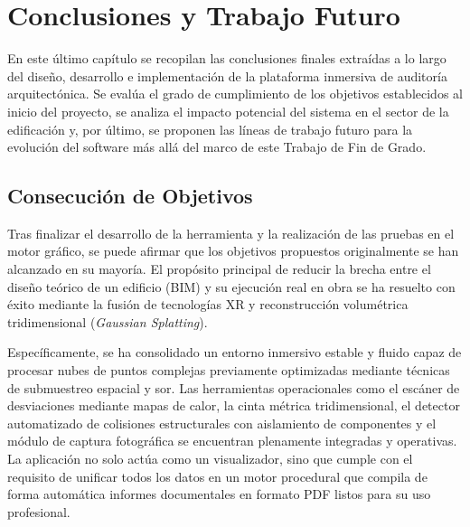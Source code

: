\chapter{Conclusiones y Trabajo Futuro\label{conclusiones}}

En este último capítulo se recopilan las conclusiones finales extraídas a lo largo del diseño, desarrollo e implementación de la plataforma inmersiva de auditoría arquitectónica. Se evalúa el grado de cumplimiento de los objetivos establecidos al inicio del proyecto, se analiza el impacto potencial del sistema en el sector de la edificación y, por último, se proponen las líneas de trabajo futuro para la evolución del software más allá del marco de este Trabajo de Fin de Grado.

\section{Consecución de Objetivos}
Tras finalizar el desarrollo de la herramienta y la realización de las pruebas en el motor gráfico, se puede afirmar que los objetivos propuestos originalmente se han alcanzado en su mayoría. El propósito principal de reducir la brecha entre el diseño teórico de un edificio (BIM) y su ejecución real en obra se ha resuelto con éxito mediante la fusión de tecnologías XR y reconstrucción volumétrica tridimensional (\textit{Gaussian Splatting}).

Específicamente, se ha consolidado un entorno inmersivo estable y fluido capaz de procesar nubes de puntos complejas previamente optimizadas mediante técnicas de submuestreo espacial y \gls{sor}. Las herramientas operacionales como el escáner de desviaciones mediante mapas de calor, la cinta métrica tridimensional, el detector automatizado de colisiones estructurales con aislamiento de componentes y el módulo de captura fotográfica se encuentran plenamente integradas y operativas. La aplicación no solo actúa como un visualizador, sino que cumple con el requisito de unificar todos los datos en un motor procedural que compila de forma automática informes documentales en formato PDF listos para su uso profesional.

